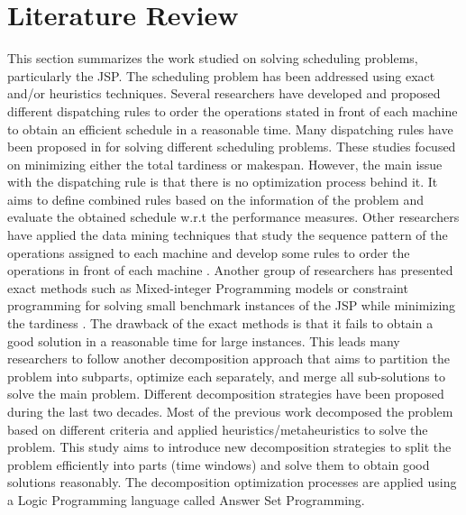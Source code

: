 \documentclass[submission,copyright,creativecommons]{eptcs}
\begin{document}
\section{Literature Review}
This section summarizes the work studied on solving scheduling problems, particularly the JSP. The scheduling problem has been addressed using exact and/or heuristics techniques. Several researchers have developed and proposed different dispatching rules to order the operations stated in front of each machine to obtain an efficient schedule in a reasonable time. Many dispatching rules have been proposed in \cite{holthaus1997efficient,kaban2012comparison,paul2015investigation} for solving different scheduling problems. These studies focused on minimizing either the total tardiness or makespan. However, the main issue with the dispatching rule is that there is no optimization process behind it. It aims to define combined rules based on the information of the problem and evaluate the obtained schedule w.r.t the performance measures. Other researchers have applied the data mining techniques that study the sequence pattern of the operations assigned to each machine and develop some rules to order the operations in front of each machine \cite{shahzad2010discovering,koonce2000using}. Another group of researchers has presented exact methods such as Mixed-integer Programming models or constraint programming for solving small benchmark instances of the JSP while minimizing the tardiness \cite{ku2016mixed,meng2020mixed}. The drawback of the exact methods is that it fails to obtain a good solution in a reasonable time for large instances. This leads many researchers to follow another decomposition approach that aims to partition the problem into subparts, optimize each separately, and merge all sub-solutions to solve the main problem. Different decomposition strategies have been proposed during the last two decades. Most of the previous work decomposed the problem based on different criteria and applied heuristics/metaheuristics to solve the problem\cite{singer2001decomposition, zhai2014decomposition,byeon1998decomposition}. This study aims to introduce new decomposition strategies to split the problem efficiently into parts (time windows) and solve them to obtain good solutions reasonably. The decomposition optimization processes are applied using a Logic Programming language called Answer Set Programming.
\end{document}

